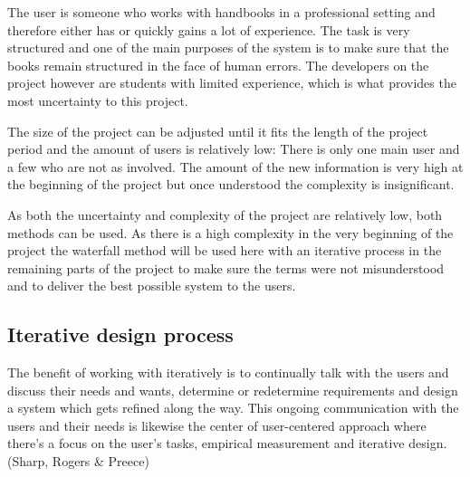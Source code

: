 The user is someone who works with handbooks in a professional setting and therefore either has or quickly gains a lot of experience. The task is very structured and one of the main purposes of the system is to make sure that the books remain structured in the face of human errors. The developers on the project however are students with limited experience, which is what provides the most uncertainty to this project. %

The size of the project can be adjusted until it fits the length of the project period and the amount of users is relatively low: There is only one main user and a few who are not as involved. The amount of the new information is very high at the beginning of the project but once understood the complexity is insignificant.

As both the uncertainty and complexity of the project are relatively low, both methods can be used. As there is a high complexity in the very beginning of the project the waterfall method will be used here with an iterative process in the remaining parts of the project to make sure the terms were not misunderstood and to deliver the best possible system to the users. %


\subsection{Iterative design process} \label{sec:iterativ}
The benefit of working with iteratively is to continually talk with the users and discuss their needs and wants, determine or redetermine requirements and design a system which gets refined along the way. This ongoing communication with the users and their needs is likewise the center of user-centered approach where there’s a focus on the user’s tasks, empirical measurement and iterative design. (Sharp, Rogers \& Preece)

